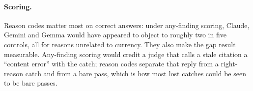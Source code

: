 \paragraph{Scoring.}
Reason codes matter most on correct answers: under any-finding scoring, Claude, Gemini and Gemma would have appeared
to object to roughly two in five controls, all for reasons unrelated to currency. They also make the gap result
measurable. Any-finding scoring would credit a judge that calls a stale citation a ``content error'' with the catch;
reason codes separate that reply from a right-reason catch and from a bare pass, which is how most lost catches
could be seen to be bare passes.
